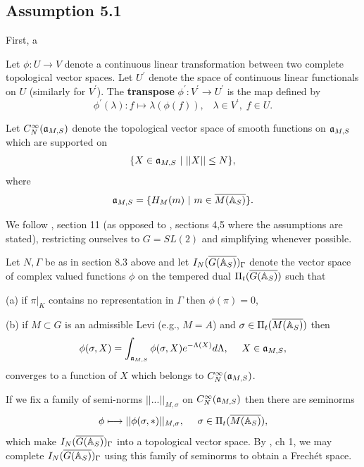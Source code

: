 \subsection{Assumption 5.1}

First, a

\begin{definition}
Let $\phi :U\rightarrow V$ denote a continuous linear transformation between
two complete topological vector spaces. Let $U^{\prime }$ denote the space
of continuous linear functionals on $U$ (similarly for $V^{\prime }$). The 
{\bf transpose} $\phi ^{\prime }:V^{\prime }\rightarrow U^{\prime }$ is the
map defined by 
\[
\phi ^{\prime }(\lambda ):f\longmapsto \lambda (\phi (f)),\;\;\;\lambda \in
V^{\prime },\;f\in U. 
\]
\end{definition}

Let $C_N^\infty({\frak{a}}_{M,S})$ denote the topological vector space of
smooth functions on ${\frak{a}}_{M,S}$ which are supported on
\[
\{X\in {\frak{a}}_{M,S}\ |\ ||X||\leq N\},
\]
where
\begin{equation}
{\frak{a}}_{M,S}
=\{H_M(m)\ |\ m\in \overline{M({\Bbb{A}}_S)}\}.
\end{equation}

We follow \cite{A11}, section 11 (as opposed to
\cite{A6}, sections 4,5 where
the assumptions are stated), restricting ourselves to
$G=SL(2)$ and simplifying whenever possible.

 Let $N,\Gamma$ be as in section 8.3 above and let
$I_N(\overline{G({\Bbb{A}}_S)})_\Gamma$ denote the vector
space of complex valued functions $\phi$
on the tempered dual $\Pi_t(\overline{G({\Bbb{A}}_S)})$ such
that

(a) if $\pi|_K$ contains no representation in $\Gamma$ then
$\phi (\pi)=0$,

(b) if $M\subset G$ is an admissible Levi (e.g., $M=A$) and
$\sigma\in \Pi_t(\overline{M({\Bbb{A}}_S)})$ then
\begin{equation}
\phi(\sigma,X)
=\int_{{\frak{a}}_{M,S}}
\phi(\sigma,X)e^{-\Lambda (X)}d\Lambda ,\ \ \ \ X\in {\frak{a}}_{M,S},
\end{equation}
converges to a function of $X$ which belongs to
$C_N^\infty({\frak{a}}_{M,S})$.

If we fix a family of semi-norms $||...||_{M,\sigma}$
on $C_N^\infty({\frak{a}}_{M,S})$ then there are seminorms
\begin{equation}
\phi\longmapsto ||\phi(\sigma,*)||_{M,\sigma},\ \ \ \
\sigma\in \Pi_t(\overline{M({\Bbb{A}}_S)}),
\end{equation}
which make $I_N(\overline{G({\Bbb{A}}_S)})_\Gamma$
into a topological vector space.
By \cite{Ru}, ch 1, we may complete
$I_N(\overline{G({\Bbb{A}}_S)})_\Gamma$ using this family of seminorms to
obtain a Frech\'et space.

